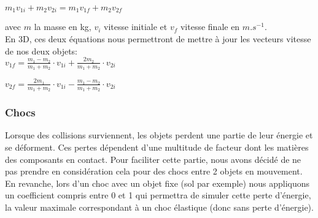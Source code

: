 \centerline{$m_1v_{1i} + m_2v_{2i} = m_1v_{1f} + m_2v_{2f}$}

\noindent avec $m$ la masse en kg, $v_{i}$ vitesse initiale et $v_{f}$ vitesse finale en $m.s^{-1}$.\\


\noindent En 3D, ces deux équations nous permettront de mettre à jour les vecteurs vitesse de nos deux objets:\\

$v_{1f} = \frac{m_1 - m_2}{m_1 + m_2} \cdot v_{1i} + \frac{2m_2}{m_1 + m_2} \cdot v_{2i}$

$v_{2f} = \frac{2m_1}{m_1 + m_2} \cdot v_{1i} - \frac{m_1 - m_2}{m_1 + m_2} \cdot v_{2i}$


\subsubsection{Chocs}
Lorsque des collisions surviennent, les objets perdent une partie de leur énergie et se déforment. Ces pertes dépendent d'une multitude de facteur dont les matières des composants en contact. Pour faciliter cette partie, nous avons décidé de ne pas prendre en considération cela pour des chocs entre 2 objets en mouvement. En revanche, lors d'un choc avec un objet fixe (sol par exemple) nous appliquons un coefficient compris entre 0 et 1 qui permettra de simuler cette perte d'énergie, la valeur maximale correspondant à un choc élastique (donc sans perte d'énergie).